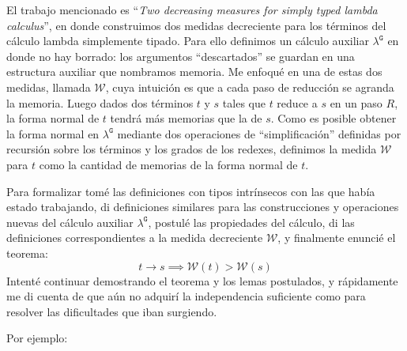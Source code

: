 \documentclass{article}
\begin{document}
El trabajo mencionado es ``{\em Two decreasing measures for simply typed lambda calculus}'', en donde construimos dos medidas decreciente para los términos del cálculo lambda simplemente tipado. Para ello definimos un cálculo auxiliar $\lambda^{\mathtt{G}}$ en donde no hay borrado: los argumentos ``descartados'' se guardan en una estructura auxiliar que nombramos memoria. Me enfoqué en una de estas dos medidas, llamada $\mathcal{W}$, cuya intuición es que a cada paso de reducción se agranda la memoria. Luego dados dos términos $t$ y $s$ tales que $t$ reduce a $s$ en un paso $R$, la forma normal de $t$ tendrá más memorias que la de $s$. Como es posible obtener la forma normal en $\lambda^{\mathtt{G}}$ mediante dos operaciones de ``simplificación'' definidas por recursión sobre los términos y los grados de los redexes, definimos la medida $\mathcal{W}$ para $t$ como la cantidad de memorias de la forma normal de $t$.

Para formalizar tomé las definiciones con tipos intrínsecos con las que había estado trabajando, di definiciones similares para las construcciones y operaciones nuevas del cálculo auxiliar $\lambda^{\mathtt{G}}$, postulé las propiedades del cálculo, di las definiciones correspondientes a la medida decreciente $\mathcal{W}$, y finalmente enuncié el teorema:
$$t \rightarrow s \implies \mathcal{W}(t) > \mathcal{W}(s)$$
Intenté continuar demostrando el teorema y los lemas postulados, y rápidamente me di cuenta de que aún no adquirí la independencia suficiente como para resolver las dificultades que iban surgiendo.

Por ejemplo:
\end{document}

